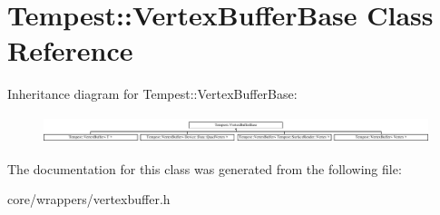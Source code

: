 \hypertarget{class_tempest_1_1_vertex_buffer_base}{\section{Tempest\+:\+:Vertex\+Buffer\+Base Class Reference}
\label{class_tempest_1_1_vertex_buffer_base}
}
Inheritance diagram for Tempest\+:\+:Vertex\+Buffer\+Base\+:\begin{figure}[H]
\begin{center}
\leavevmode
\includegraphics[height=0.802292cm]{class_tempest_1_1_vertex_buffer_base}
\end{center}
\end{figure}


The documentation for this class was generated from the following file\+:\begin{DoxyCompactItemize}
\item 
core/wrappers/vertexbuffer.\+h\end{DoxyCompactItemize}
